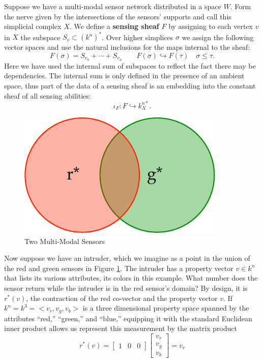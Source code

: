 \begin{defn}
	Suppose we have a multi-modal sensor network distributed in a space $W$. Form the nerve given by the intersections of the sensors' supports and call this simplicial complex $X$. We define a \textbf{sensing sheaf} $F$ by assigning to each vertex $v$ in $X$ the subspace $S_v\subset (k^n)^{*}$. Over higher simplices $\sigma$ we assign the following vector spaces and use the natural inclusions for the maps internal to the sheaf:
	\[
		F(\sigma)=S_{v_0}+\cdots + S_{v_n} \qquad F(\sigma)\hookrightarrow F(\tau) \quad \sigma\leq \tau.
	\]
	Here we have used the internal sum of subspaces to reflect the fact there may be dependencies. The internal sum is only defined in the presence of an ambient space, thus part of the data of a sensing sheaf is an embedding into the constant sheaf of all sensing abilities:
	\[
		\iota_F: F \hookrightarrow k^{n*}_X.
	\]
\end{defn}

\begin{figure}
\centering
\includegraphics[width=.5\textwidth]{rg_sense.pdf}
\caption{Two Multi-Modal Sensors}
\label{fig:rg_sense}
\end{figure}

Now suppose we have an intruder, which we imagine as a point in the union of the red and green sensors in Figure \ref{fig:rg_sense}. The intruder has a property vector $v\in k^n$ that lists its various attributes, its colors in this example. What number does the sensor return while the intruder is in the red sensor's domain? By design, it is $r^*(v)$, the contraction of the red co-vector and the property vector $v$. If $k^n=k^3=<v_r,v_g,v_b>$ is a three dimensional property space spanned by the attributes ``red,'' ``green,'' and ``blue,'' equipping it with the standard Euclidean inner product allows us represent this measurement by the matrix product
\[
	r^*(v)=\begin{bmatrix} 1 & 0 & 0\end{bmatrix}\begin{bmatrix} v_r \\ v_g \\ v_b\end{bmatrix}=v_r
\]

